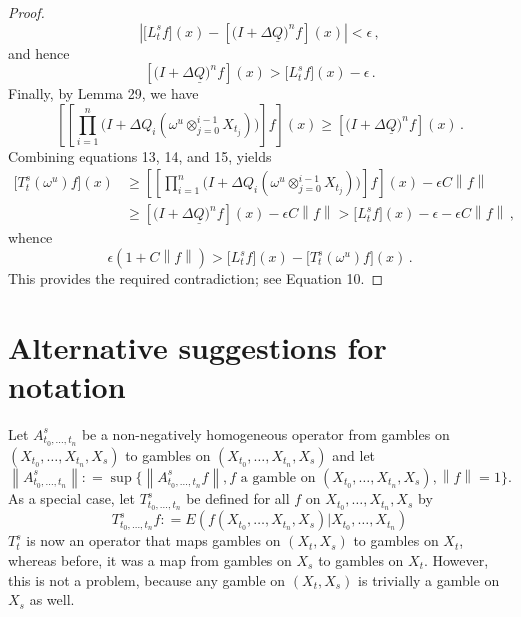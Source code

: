 \documentclass[a4paper,reqno]{amsart}
\newcommand{\lrate}{\underline{Q}}
\newcommand{\norm}[1]{\left\lVert #1 \right\rVert}
\newcommand{\coloneqq}{:\!=}
\begin{document}
\begin{proof}
\begin{equation*}
\left\vert \bigl[L_t^sf\bigr](x) - \left[\bigl(I + \Delta\lrate\bigr)^n f\right](x)\right\vert < \epsilon\,,
\end{equation*}
and hence
\begin{equation}
\left[\bigl(I + \Delta\lrate\bigr)^n f\right](x) > \bigl[L_t^sf\bigr](x) - \epsilon\,.
\end{equation}
Finally, by Lemma 29, we have
\begin{equation}
\left[\left[\prod_{i=1}^n\bigl(I + \Delta Q_i(\omega^u\otimes_{j=0}^{i-1}X_{t_j})\bigr) \right]f\right](x) \geq \left[\bigl(I + \Delta\lrate\bigr)^n f\right](x)\,.
\end{equation}
Combining equations 13, 14, and 15, yields
\begin{align*}
\bigl[T_t^s(\omega^u)f\bigr](x) &\geq \left[\left[\prod_{i=1}^n\bigl(I + \Delta Q_i(\omega^u\otimes_{j=0}^{i-1}X_{t_j})\bigr) \right]f\right](x) - \epsilon C\norm{f} \\
 &\geq \left[\bigl(I + \Delta\lrate\bigr)^n f\right](x) - \epsilon C\norm{f} > \bigl[L_t^sf\bigr](x) - \epsilon - \epsilon C\norm{f}\,,
\end{align*}
whence
\begin{equation*}
\epsilon(1+C\norm{f})> \bigl[L_t^sf\bigr](x) - \bigl[T_t^s(\omega^u)f\bigr](x)\,.
\end{equation*}
This provides the required contradiction; see Equation 10.
\end{proof}

\newpage
\section{Alternative suggestions for notation}

Let $A^s_{t_0,\dots,t_n}$ be a non-negatively homogeneous operator from gambles on $(X_{t_0},\dots,X_{t_n},X_s)$ to gambles on $(X_{t_0},\dots,X_{t_n},X_s)$
and let
\begin{equation*}
\norm{A^s_{t_0,\dots,t_n}}\coloneqq\sup\Big\{\norm{A^s_{t_0,\dots,t_n}f}, \text{$f$ a gamble on $(X_{t_0},\dots,X_{t_n},X_s)$}, \norm{f}=1\Big\}.
\end{equation*}
As a special case, let $T^s_{t_0,\dots,t_n}$ be defined for all $f$ on $X_{t_0},\dots,X_{t_n},X_s$ by
\begin{equation*}
T^s_{t_0,\dots,t_n}f\coloneqq E(f(X_{t_0},\dots,X_{t_n},X_s)\vert X_{t_0},\dots,X_{t_n})
\end{equation*}
$T^s_t$ is now an operator that maps gambles on $(X_t,X_s)$ to gambles on $X_t$, whereas before, it was a map from gambles on $X_s$ to gambles on $X_t$. However, this is not a problem, because any gamble on $(X_t,X_s)$ is trivially a gamble on $X_s$ as well.
\end{document}
